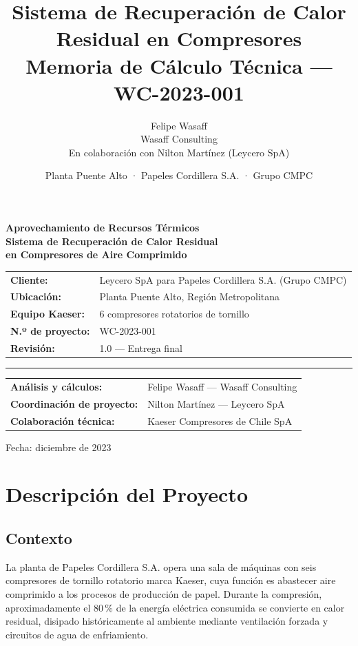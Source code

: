 \documentclass[11pt,a4paper]{article}
\title{%
  \textbf{Sistema de Recuperación de Calor Residual en Compresores}\\[0.5em]
  \large Memoria de Cálculo Técnica — WC-2023-001
}
\author{%
  Felipe Wasaff\\
  \small Wasaff Consulting\\[0.3em]
  \small En colaboración con Nilton Martínez (Leycero SpA)
}
\date{Planta Puente Alto · Papeles Cordillera S.A. · Grupo CMPC}
\newcommand{\dato}[2]{\textbf{#1} & #2 \\}
\begin{document}
\begin{titlepage}
\centering
\vspace*{1.5cm}
{\Large\bfseries\color{navyblue}
Aprovechamiento de Recursos Térmicos\\[0.3em]
Sistema de Recuperación de Calor Residual\\[0.3em]
en Compresores de Aire Comprimido}\\[1.2cm]

\begin{tabular}{ll}
\dato{Cliente:}{Leycero SpA para Papeles Cordillera S.A. (Grupo CMPC)}
\dato{Ubicación:}{Planta Puente Alto, Región Metropolitana}
\dato{Equipo Kaeser:}{6 compresores rotatorios de tornillo}
\dato{N.º de proyecto:}{WC-2023-001}
\dato{Revisión:}{1.0 — Entrega final}
\end{tabular}

\vspace{1cm}
\rule{0.8\textwidth}{0.4pt}
\vspace{0.8cm}

\begin{tabular}{ll}
\dato{Análisis y cálculos:}{Felipe Wasaff — Wasaff Consulting}
\dato{Coordinación de proyecto:}{Nilton Martínez — Leycero SpA}
\dato{Colaboración técnica:}{Kaeser Compresores de Chile SpA}
\end{tabular}

\vfill
{\small Fecha: diciembre de 2023}
\end{titlepage}

\tableofcontents
\listoftables
\newpage

\section{Descripción del Proyecto}

\subsection{Contexto}

La planta de Papeles Cordillera S.A. opera una sala de máquinas con seis compresores de
tornillo rotatorio marca Kaeser, cuya función es abastecer aire comprimido a los procesos
de producción de papel. Durante la compresión, aproximadamente el 80\,\% de la energía
eléctrica consumida se convierte en calor residual, disipado históricamente al ambiente
mediante ventilación forzada y circuitos de agua de enfriamiento.
\end{document}

